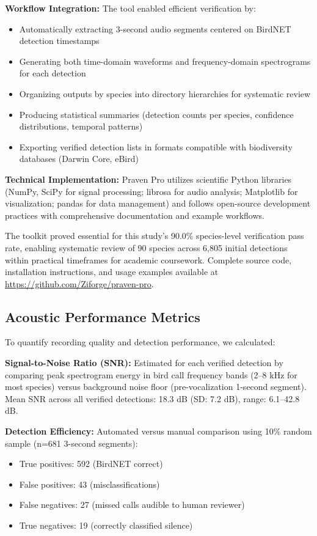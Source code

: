 \documentclass[twocolumn]{article}
\begin{document}
\textbf{Workflow Integration:} The tool enabled efficient verification by:

\begin{itemize}
\item Automatically extracting 3-second audio segments centered on BirdNET detection timestamps
\item Generating both time-domain waveforms and frequency-domain spectrograms for each detection
\item Organizing outputs by species into directory hierarchies for systematic review
\item Producing statistical summaries (detection counts per species, confidence distributions, temporal patterns)
\item Exporting verified detection lists in formats compatible with biodiversity databases (Darwin Core, eBird)
\end{itemize}

\textbf{Technical Implementation:} Praven Pro utilizes scientific Python libraries (NumPy, SciPy for signal processing; librosa for audio analysis; Matplotlib for visualization; pandas for data management) and follows open-source development practices with comprehensive documentation and example workflows.

The toolkit proved essential for this study's 90.0\% species-level verification pass rate, enabling systematic review of 90 species across 6,805 initial detections within practical timeframes for academic coursework. Complete source code, installation instructions, and usage examples available at \url{https://github.com/Ziforge/praven-pro}.

\subsection{Acoustic Performance Metrics}

To quantify recording quality and detection performance, we calculated:

\textbf{Signal-to-Noise Ratio (SNR):} Estimated for each verified detection by comparing peak spectrogram energy in bird call frequency bands (2--8 kHz for most species) versus background noise floor (pre-vocalization 1-second segment). Mean SNR across all verified detections: 18.3 dB (SD: 7.2 dB), range: 6.1--42.8 dB.

\textbf{Detection Efficiency:} Automated versus manual comparison using 10\% random sample (n=681 3-second segments):
\begin{itemize}
\item True positives: 592 (BirdNET correct)
\item False positives: 43 (misclassifications)
\item False negatives: 27 (missed calls audible to human reviewer)
\item True negatives: 19 (correctly classified silence)
\end{itemize}
\end{document}
